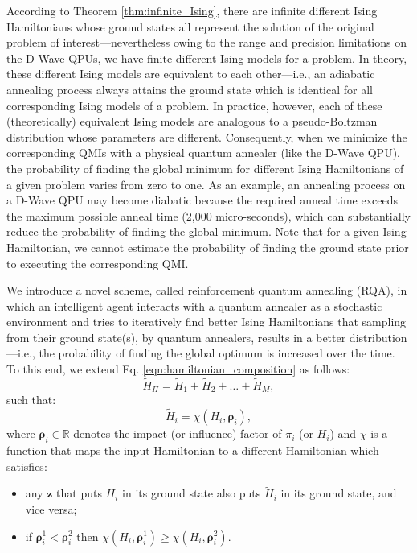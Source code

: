 \documentclass[fleqn,10pt]{wlscirep}
\begin{document}
According to Theorem \ref{thm:infinite_Ising}, there are infinite different Ising Hamiltonians whose ground states all represent the solution of the original problem of interest—nevertheless owing to the range and precision limitations on the D-Wave QPUs, we have finite different Ising models for a problem. In theory, these different Ising models are equivalent to each other—i.e., an adiabatic annealing process always attains the ground state which is identical for all corresponding Ising models of a problem. In practice, however, each of these (theoretically) equivalent Ising models are analogous to a pseudo-Boltzman distribution whose parameters are different. Consequently, when we minimize the corresponding QMIs with a physical quantum annealer (like the D-Wave QPU), the probability of finding the global minimum for different  Ising Hamiltonians of a given problem varies from zero to one. As an example, an annealing process on a D-Wave QPU may become diabatic because the required anneal time exceeds the maximum possible anneal time (2,000 micro-seconds), which can substantially reduce the probability of finding the global minimum. Note that for a given Ising Hamiltonian, we cannot estimate the probability of finding the ground state prior to executing the corresponding QMI. 

We introduce a novel scheme, called reinforcement quantum annealing (RQA),  in which an intelligent agent interacts with a quantum annealer as a stochastic environment and tries to iteratively find better Ising Hamiltonians that sampling from their ground state(s), by quantum annealers, results in a better distribution—i.e., the probability of finding the global optimum is increased over the time.
To this end, we extend Eq. \eqref{eqn:hamiltonian_composition} as follows:
\begin{equation} 
	\label{eqn:RQA_ext_h}
	\widetilde{H}_{\Pi} = \widetilde{H}_{1} + \widetilde{H}_{2} + \dots + \widetilde{H}_{M},
\end{equation}
such that: 
\begin{equation} 
	\label{eqn:RQA_chi}
	\widetilde{H}_{i} = \chi \left({H_i, \boldsymbol{\rho}_i} \right),
\end{equation}	
where $\boldsymbol{\rho}_i \in \mathbb{R}$ denotes the impact (or influence) factor of $\pi_i$ (or $H_i$) and $\chi$ is a function that maps the input Hamiltonian to a different Hamiltonian which satisfies:
\begin{itemize} 
	\item any $\mathbf{z}$ that puts $H_i$ in its ground state also puts $\widetilde{H}_i$ in its ground state, and vice versa;
	\item if $\boldsymbol{\rho}_i^1 < \boldsymbol{\rho}_i^2$ then $\chi \left({H_i, \boldsymbol{\rho}_i^1}\right) \ge \chi \left({H_i, \boldsymbol{\rho}_i^2}\right)$.
\end{itemize}
\end{document}
